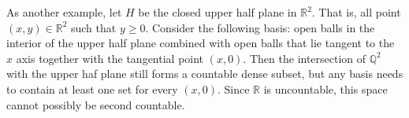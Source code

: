 \documentclass{article}                                                        %
\begin{document}
        \begin{example}
            As another example, let $H$ be the closed upper half plane in
            $\mathbb{R}^{2}$. That is, all point $(x,y)\in\mathbb{R}^{2}$ such
            that $y\geq{0}$. Consider the following basis: open balls in the
            interior of the upper half plane combined with open balls that lie
            tangent to the $x$ axis together with the tangential point $(x,0)$.
            Then the intersection of $\mathbb{Q}^{2}$ with the upper haf plane
            still forms a countable dense subset, but any basis needs to contain
            at least one set for every $(x,0)$. Since $\mathbb{R}$ is
            uncountable, this space cannot possibly be second countable.
        \end{example}
\end{document}
